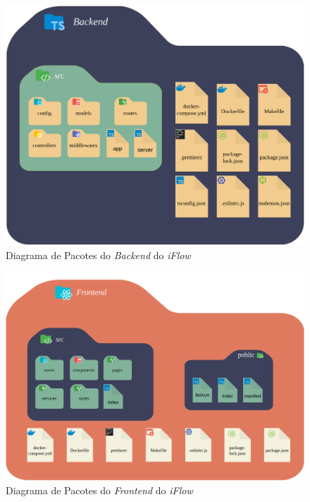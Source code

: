 \begin{figure}[H]
    \begin{center}
        \caption{{Diagrama de Pacotes do \textit{Backend} do \textit{iFlow}}}
        \label{fig:pacotes_backend}
        \includegraphics[scale=0.7]{figuras/Proposta/Diagrama_de_Pacotes-Backend.png}
    \end{center}
\end{figure}

\begin{figure}[H]
    \begin{center}
        \caption{{Diagrama de Pacotes do \textit{Frontend} do \textit{iFlow}}}
        \label{fig:pacotes_frontend}
        \includegraphics[scale=0.58]{figuras/Proposta/Diagrama_de_Pacotes-Frontend.png}
    \end{center}
\end{figure}

